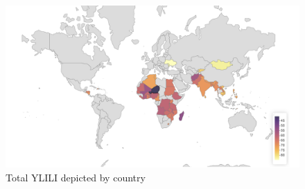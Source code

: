 \documentclass[
  a4paper, twoside, 12pt]{book}
\begin{document}
\begin{figure}[H]

{\centering \includegraphics[width=1\linewidth,]{figures/maps/YLILI_total} 

}

\caption{Total YLILI depicted by country}\label{fig:fig-worldmap}
\end{figure}
\end{document}
